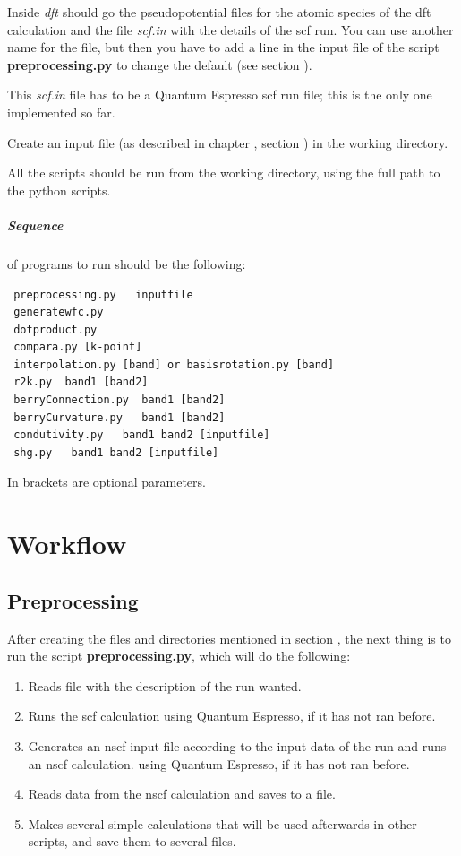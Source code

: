 \documentclass[a4paper,12pt]{report}
\begin{document}
 Inside \emph{dft} should go the pseudopotential files for the atomic species of the dft calculation
and the file \emph{scf.in} with the details of the scf run.
You can use another name for the file, but then you have to add a line in the input file of
the script \textbf{preprocessing.py} to change the default (see section ).

 This \emph{scf.in} file has to be a {\sc Quantum Espresso} scf run file;
 this is the only one implemented so far.

 Create an input file (as described in chapter , section )
 in the working directory.

 All the scripts should be run from the working directory, using the full path to the python scripts.

\paragraph{Sequence} of programs to run should be the following:
\begin{verbatim}
 preprocessing.py   inputfile
 generatewfc.py
 dotproduct.py
 compara.py [k-point]
 interpolation.py [band] or basisrotation.py [band]
 r2k.py  band1 [band2]
 berryConnection.py  band1 [band2]
 berryCurvature.py   band1 [band2]
 condutivity.py   band1 band2 [inputfile]
 shg.py   band1 band2 [inputfile]
\end{verbatim}
In brackets are optional parameters.




\chapter{Workflow}\label{ch:workflow}

\section{Preprocessing}\label{sec:preprocessing}
 After creating the files and directories mentioned in section , the next thing is
 to run the script \textbf{preprocessing.py}, which will do the following:
 \begin{enumerate}
  \item Reads file with the description of the run wanted.
  \item Runs the scf calculation using {\sc Quantum Espresso}, if it has not ran before.
  \item Generates an nscf input file according to the input data of the run and runs an nscf calculation.
  using {\sc Quantum Espresso}, if it has not ran before.
  \item Reads data from the nscf calculation and saves to a file.
  \item Makes several simple calculations that will be used afterwards in other scripts, and save them to several files.
 \end{enumerate}
\end{document}

